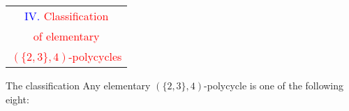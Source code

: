 \documentclass[%
pdf,
colorBG,
slideColor,
]{prosper}
\begin{document}
\begin{slide}{}
\begin{center}
{\Huge 
\begin{tabular*}{8cm}{c}
\\[-0.5cm]
\textcolor{blue}{IV. }\textcolor{red}{Classification}\\
\textcolor{red}{of elementary}\\
\textcolor{red}{$(\{2,3\},4)$-polycycles}
\end{tabular*}
}
\end{center}
\end{slide}


\begin{slide}{The classification}
Any elementary $(\{2,3\}, 4)$-polycycle is one of the following eight:

\begin{center}
\begin{minipage}{2.5cm}
\centering
{}\par
\end{minipage}
\begin{minipage}{2.5cm}
\centering
{}\par
\end{minipage}
\begin{minipage}{3.0cm}
\centering
{}\par
\end{minipage}
\begin{minipage}{2.5cm}
\centering
{}\par
\end{minipage}
\begin{minipage}{2.5cm}
\centering
{}\par
\end{minipage}
\begin{minipage}{2.5cm}
\centering
{}\par
\end{minipage}
\begin{minipage}{2.5cm}
\centering
{}\par
\end{minipage}
\begin{minipage}{2.5cm}
\centering
{}\par
\end{minipage}
\end{center}
\end{slide}
\end{document}
